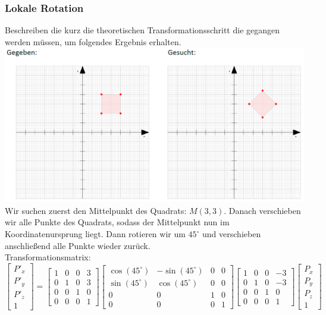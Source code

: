 \documentclass[11pt, a4paper]{article} %
\begin{document}
\newpage
\subsubsection*{Lokale Rotation}
Beschreiben die kurz die theoretischen Transformationsschritt die gegangen werden müssen, um folgendes Ergebnis erhalten. \\[0.1cm]
\includegraphics[scale=0.5]{lr.png} \\[0.1cm]
Wir suchen zuerst den Mittelpunkt des Quadrats: $M(3,3)$. Danach verschieben wir alle Punkte des Quadrats, sodass der Mittelpunkt nun im Koordinatenursprung liegt. Dann rotieren wir um $45^\circ$ und verschieben anschließend alle Punkte wieder zurück. \\
Transformationsmatrix: $\begin{bmatrix}
	P'_x \\ P'_y \\ P'_z \\ 1
\end{bmatrix} = \begin{bmatrix}
	1 & 0 & 0 & 3 \\ 0 & 1 & 0 & 3 \\ 0 & 0 & 1 & 0 \\ 0 & 0 & 0 & 1
\end{bmatrix} \begin{bmatrix}
	\cos(45^\circ) & -\sin(45^\circ) & 0 & 0 \\ \sin(45^\circ) & \cos(45^\circ) & 0 & 0 \\ 0 & 0 & 1 & 0 \\ 0 & 0 & 0 & 1
\end{bmatrix} \begin{bmatrix}
1 & 0 & 0 & -3 \\ 0 & 1 & 0 & -3 \\ 0 & 0 & 1 & 0 \\ 0 & 0 & 0 & 1
\end{bmatrix} \begin{bmatrix}
	P_x \\ P_y \\ P_z \\ 1
\end{bmatrix}$
\end{document}
